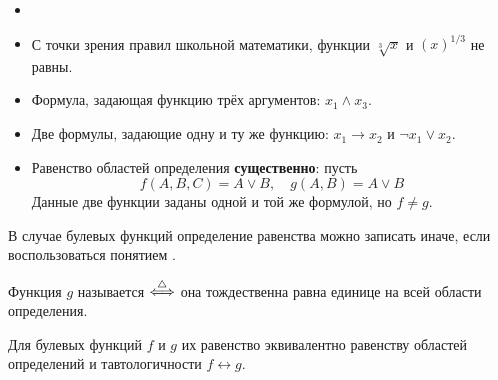 \begin{example}
    \label{example:boolean:formulas}
    \begin{itemize}
        \item[] %
        \item С точки зрения правил школьной математики, функции $ \sqrt[3]{x} $ и $ (x)^{1/3} $ не равны.
        \item Формула, задающая функцию трёх аргументов: $ x_1 \wedge x_3 $.
        \item Две формулы, задающие одну и ту же функцию: $ x_1 \rightarrow x_2 $ и $ \neg x_1 \vee x_2 $.
        \item Равенство областей определения \textbf{существенно}: пусть
            \[
                f(A,B,C) = A \vee B, \quad g(A,B) = A \vee B
            \]
            Данные две функции заданы одной и той же формулой, но $ f \neq g $.
    \end{itemize}
\end{example}

В случае булевых функций определение равенства можно записать иначе, если воспользоваться понятием .

\begin{definition}
    Функция $ g $ называется  $ \overset{\triangle}{\Longleftrightarrow} $ она тождественна равна единице на всей области определения.
\end{definition}

\begin{remark}
    Для булевых функций $ f $ и $ g $ их равенство эквивалентно равенству областей определений и тавтологичности $ f \leftrightarrow g $.
\end{remark}


